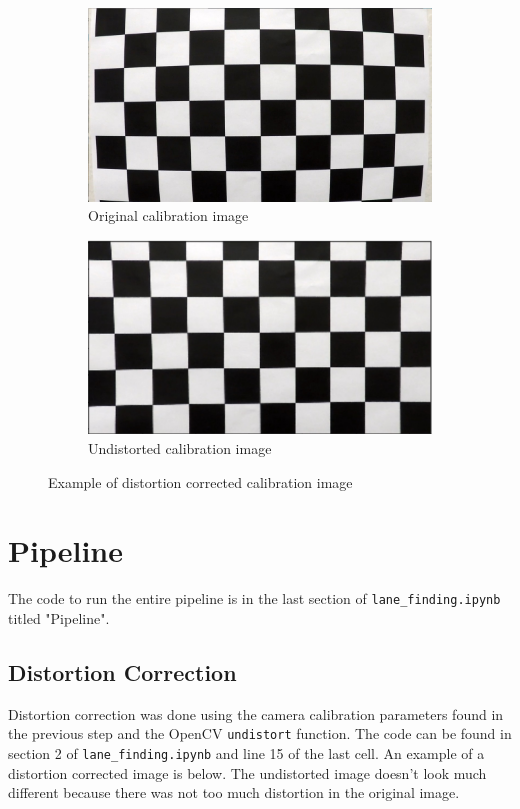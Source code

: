 \documentclass[12pt]{article}
\begin{document}
\begin{figure}[h]
\centering
\begin{subfigure}{.5\textwidth}
  \centering
  \includegraphics[width=1\linewidth]{../camera_cal/calibration1.jpg}
  \caption{Original calibration image}
\end{subfigure}%
\begin{subfigure}{.5\textwidth}
  \centering
  \includegraphics[width=1\linewidth]{undistorted_calibration.png}
  \caption{Undistorted calibration image}
\end{subfigure}
\caption{Example of distortion corrected calibration image}
\label{fig:distortion_correction_calibration}
\end{figure}

\section{Pipeline}

The code to run the entire pipeline is in the last section of \texttt{lane\_finding.ipynb} titled "Pipeline".

\subsection{Distortion Correction}
Distortion correction was done using the camera calibration parameters found in the previous step and the OpenCV \texttt{undistort} function. The code can be found in section 2 of \texttt{lane\_finding.ipynb} and line 15 of the last cell. An example of a distortion corrected image is below. The undistorted image doesn't look much different because there was not too much distortion in the original image.
\end{document}
